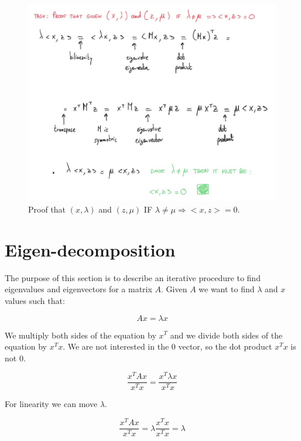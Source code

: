 \begin{figure}[H]
	\centering
	\includegraphics[scale=0.85]{images/04_LinearAlgebra_symmetricMatrixProof.jpg}
	\caption{Proof that $(x, \lambda)$ and $(z, \mu)$ IF
	$\lambda \neq \mu \Rightarrow <x,z>=0$.}
	\label{fig:proof_eigen_symmetric}
\end{figure}

\section{Eigen-decomposition}
The purpose of this section is to describe an iterative procedure to find eigenvalues
and eigenvectors for a matrix $A$. Given $A$ we want to find $\lambda$ and $x$
values such that:

\begin{equation*}
	Ax=\lambda x
\end{equation*}

We multiply both sides of the equation by $x^{T}$ and we divide both sides of the
equation by $x^{T}x$. We are not interested in the 0 vector, so the dot product $x
^{T}x$ is not 0.

\begin{equation*}
	\frac{x^{T}A x}{x^{T}x}= \frac{x^{T}\lambda x}{x^{T}x}
\end{equation*}

For linearity we can move $\lambda$.

\begin{equation*}
	\frac{x^{T}A x}{x^{T}x}= \lambda \frac{x^{T}x}{x^{T}x}= \lambda
\end{equation*}

